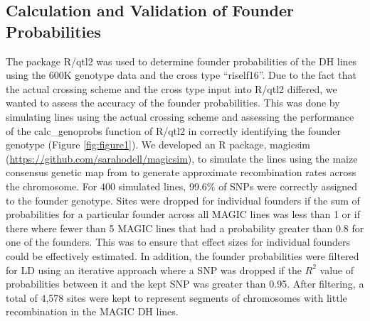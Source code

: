 \documentclass[article,9pt,twocolumn,twoside]{rilabRxiv}
\begin{document}
\subsection{Calculation and Validation of Founder Probabilities}
The package R/qtl2 \citep{RN2} was used to determine founder probabilities of the DH lines using the 600K genotype data and the cross type ``riself16''. Due to the fact that the actual crossing scheme and the cross type input into R/qtl2 differed, we wanted to assess the accuracy of the founder probabilities. This was done by simulating lines using the actual crossing scheme and assessing the performance of the calc\_genoprobs function of R/qtl2 in correctly identifying the founder genotype (Figure \ref{fig:figure1}). We developed an R package, magicsim (\url{https://github.com/sarahodell/magicsim}), to simulate the lines using the maize consensus genetic map from \citep{ogut2015joint} to generate approximate recombination rates across the chromosome. For 400 simulated lines, 99.6\% of SNPs were correctly assigned to the founder genotype. Sites were dropped for individual founders if the sum of probabilities for a particular founder across all MAGIC lines was less than 1 or if there where fewer than 5 MAGIC lines that had a probability greater than 0.8 for one of the founders. This was to ensure that effect sizes for individual founders could be effectively estimated. In addition, the founder probabilities were filtered for LD using an iterative approach where a SNP was dropped if the $R^2$ value of probabilities between it and the kept SNP was greater than 0.95. After filtering, a total of 4,578 sites were kept to represent segments of chromosomes with little recombination in the MAGIC DH lines.
\end{document}
